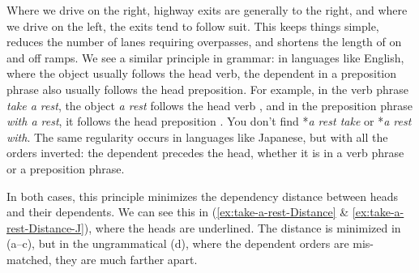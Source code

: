 
Where we drive on the right, highway exits are generally to the right, and where we drive on the left, the exits tend to follow suit. This keeps things simple, reduces the number of lanes requiring overpasses, and shortens the length of on and off ramps. We see a similar principle in grammar: in languages like English, where the object usually follows the head verb, the dependent in a preposition phrase also usually follows the head preposition. For example, in the verb phrase \textit{take a rest}, the object \textit{a rest} follows the head verb , and in the preposition phrase \textit{with a rest}, it follows the head preposition . You don't find *\textit{a rest take} or *\textit{a rest with}. The same regularity occurs in languages like Japanese, but with all the orders inverted: the dependent precedes the head, whether it is in a verb phrase or a preposition phrase.

In both cases, this principle minimizes the dependency distance between heads and their dependents. We can see this in (\ref{ex:take-a-rest-Distance} \& \ref{ex:take-a-rest-Distance-J}), where the heads are underlined. The distance is minimized in (a--c), but in the ungrammatical (d), where the dependent orders are mis-matched, they are much farther apart.

\ea \label{ex:take-a-rest-Distance}
    \z
\z

\ea \label{ex:take-a-rest-Distance-J}
    \z
\z

